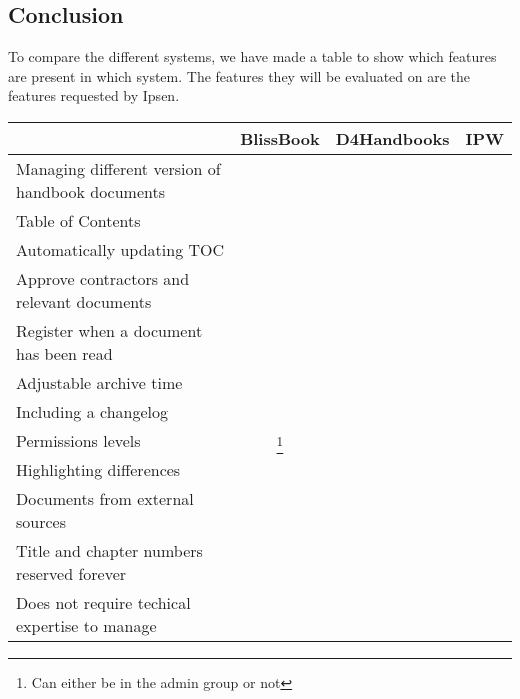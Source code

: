 \subsection{Conclusion}
To compare the different systems, we have made a table to show which features are present in which system.
The features they will be evaluated on are the features requested by Ipsen.
\begin{center}
  \begin{tabular}{| l | c | c | c |}
    \hline
		 & BlissBook & D4Handbooks & IPW \\ \hline
		Managing different version of handbook documents & \checkmark &  &  \\ \hline
		Table of Contents & \checkmark &  &  \\ \hline
		Automatically updating TOC & \checkmark &  &  \\ \hline
		Approve contractors and relevant documents &  &  &  \\ \hline
		Register when a document has been read & \checkmark &  &  \\ \hline
		Adjustable archive time &  &  &  \\ \hline
		Including a changelog & \checkmark &  &  \\ \hline
		Permissions levels & \checkmark\footnote{Can either be in the admin group or not} &  &  \\ \hline
		Highlighting differences & \checkmark &  &  \\ \hline
		Documents from external sources &  &  &  \\ \hline
		Title and chapter numbers reserved forever &  &  &  \\ \hline
		Does not require techical expertise to manage & \checkmark &  &  \\
    \hline
  \end{tabular}
  
\end{center}

